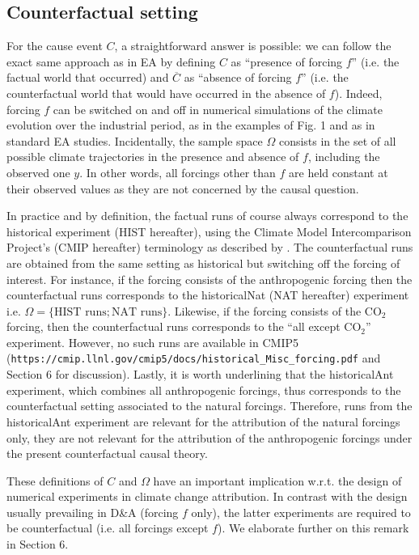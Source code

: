 \documentclass[12pt]{article}
\begin{document}
\subsection{Counterfactual setting}

For the cause event $C$, a straightforward answer is possible: we can follow the exact same approach as in EA by defining $C$ as ``presence of forcing $f$'' (i.e. the factual world that occurred) and $\overline{C}$ as ``absence of forcing $f$'' (i.e. the counterfactual world that would have occurred in the absence of $f$). Indeed, forcing $f$ can be switched on and off in numerical simulations of the climate evolution over the industrial period, as in the examples of Fig. 1  and as in standard EA studies. %
Incidentally, the sample space $\Omega$ consists in the set of all possible climate trajectories in the presence and absence of $f$, including the observed one $y$. In other words, all forcings other than $f$ are held constant at their observed values as they are not concerned by the causal question. %

In practice and by definition, the factual runs of course always correspond to the historical experiment (HIST hereafter), using the Climate Model Intercomparison Project's (CMIP hereafter) terminology as described by \cite{Tay12}. The counterfactual runs are obtained from the same setting as historical but switching off the forcing of interest. For instance, if the forcing consists of the anthropogenic forcing then the counterfactual runs corresponds to the historicalNat (NAT hereafter) experiment i.e. $\Omega=\{ \textrm{HIST runs};\textrm{NAT runs}\}$. Likewise, if the forcing consists of the CO$_2$ forcing, then the counterfactual runs corresponds to the ``all except CO$_2$'' experiment. However, no such runs are available in CMIP5\\
(\verb|https://cmip.llnl.gov/cmip5/docs/historical_Misc_forcing.pdf| and Section 6 for discussion). Lastly, it is worth underlining that the historicalAnt experiment, which combines all anthropogenic forcings, thus corresponds to the counterfactual setting associated to the natural forcings. Therefore, runs from the historicalAnt experiment are relevant for the attribution of the natural forcings only, they are not relevant for the attribution of the anthropogenic forcings under the present counterfactual causal theory.

These definitions of $C$ and $\Omega$ %
have an important implication w.r.t. the design of numerical experiments in climate change attribution. In contrast with the design usually prevailing in D\&A (forcing $f$ only), the latter experiments are required to be counterfactual (i.e. all forcings except $f$). We elaborate further on this remark in Section 6.
\end{document}
